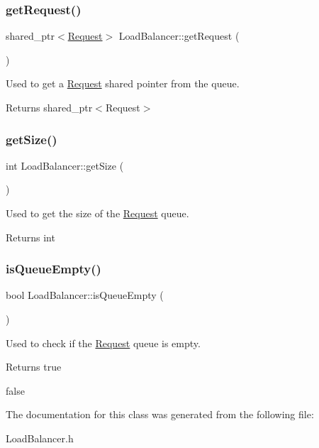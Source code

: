 \subsubsection{\texorpdfstring{get\+Request()}{getRequest()}}
{\footnotesize\ttfamily shared\+\_\+ptr$<$\hyperlink{classRequest}{Request}$>$ Load\+Balancer\+::get\+Request (\begin{DoxyParamCaption}{ }\end{DoxyParamCaption})\hspace{0.3cm}{\ttfamily [inline]}}



Used to get a \hyperlink{classRequest}{Request} shared pointer from the queue. 

\begin{DoxyReturn}{Returns}
shared\+\_\+ptr$<$\+Request$>$ 
\end{DoxyReturn}
\mbox{\label{classLoadBalancer_ae410e0a4d5fe01f6aaebd34c7edb4a54}} 
\subsubsection{\texorpdfstring{get\+Size()}{getSize()}}
{\footnotesize\ttfamily int Load\+Balancer\+::get\+Size (\begin{DoxyParamCaption}{ }\end{DoxyParamCaption})\hspace{0.3cm}{\ttfamily [inline]}}



Used to get the size of the \hyperlink{classRequest}{Request} queue. 

\begin{DoxyReturn}{Returns}
int 
\end{DoxyReturn}
\mbox{\label{classLoadBalancer_a27b39e3bd5ac47e6845ec63c73cbe436}} 
\subsubsection{\texorpdfstring{is\+Queue\+Empty()}{isQueueEmpty()}}
{\footnotesize\ttfamily bool Load\+Balancer\+::is\+Queue\+Empty (\begin{DoxyParamCaption}{ }\end{DoxyParamCaption})\hspace{0.3cm}{\ttfamily [inline]}}



Used to check if the \hyperlink{classRequest}{Request} queue is empty. 

\begin{DoxyReturn}{Returns}
true 

false 
\end{DoxyReturn}


The documentation for this class was generated from the following file\+:\begin{DoxyCompactItemize}
\item 
Load\+Balancer.\+h\end{DoxyCompactItemize}
